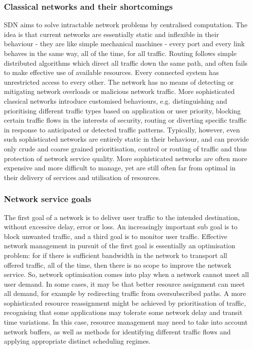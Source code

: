 \subsubsection{Classical networks and their shortcomings}
SDN aims to solve intractable network problems by centralised computation.  The idea is that current networks are essentially static and inflexible in their behaviour - they are like simple mechanical machines - every port and every link behaves in the same way, all of the time, for all traffic.  Routing follows simple distributed algorithms which direct all traffic down the same path, and often fails to make effective use of available resources. Every connected system has unrestricted access to every other.  The network has no means of detecting or mitigating network overloads or malicious network traffic.
More sophisticated classical networks introduce customised behaviours, e.g. distinguishing and prioritising different traffic types based on application or user priority, blocking certain traffic flows in the interests of security, routing or diverting specific traffic in response to anticipated or detected traffic patterns.  Typically, however, even such sophisticated networks are entirely static in their behaviour, and can provide only crude and coarse grained prioritisation, control or routing of traffic and thus protection of network service quality.  More sophisticated networks are often more expensive and more difficult to manage, yet are still often far from optimal in their delivery of services and utilisation of resources.
\subsubsection{Network service goals}
The first goal of a network is to deliver user traffic to the intended destination, without excessive delay, error or loss.  An increasingly important sub goal is to block unwanted traffic, and a third goal is to monitor user traffic.
Effective network management in pursuit of the first goal is essentially an optimisation problem: for if there is sufficient bandwidth in the network to transport all offered traffic, all of the time, then there is no scope to improve the network service.  So, network optimisation comes into play when a network cannot meet all user demand.  In some cases, it may be that better resource assignment can meet all demand, for example by redirecting traffic from oversubscribed paths.  A more sophisticated resource reassignment might be achieved by prioritisation of traffic, recognising that some applications may tolerate some network delay and transit time variations.  In this case, resource management may need to take into account network buffers, as well as methods for identifying different traffic flows and applying appropriate distinct scheduling regimes.

